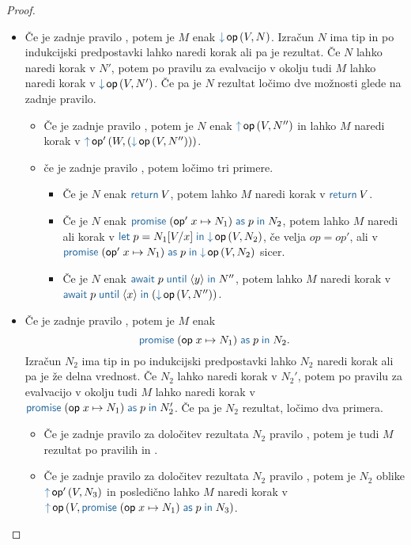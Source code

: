 \begin{proof}
\begin{itemize}
		\item Če je zadnje pravilo , potem je $M$ enak $\tmopin{op}{V}{N}$.
		Izračun $N$ ima tip in po indukcijski predpostavki lahko naredi korak ali pa je rezultat.
		Če $N$ lahko naredi korak v $N'$, potem po pravilu za evalvacijo v okolju tudi $M$ lahko naredi korak v $\tmopin{op}{V}{N'}$. 
		Če pa je $N$ rezultat ločimo dve možnosti glede na zadnje pravilo.
		\begin{itemize}
			\item Če je zadnje pravilo , potem je $N$ enak $\tmopout{op}{V}{N''}$ in lahko $M$ naredi korak v $\tmopout{op'}{W}{(\tmopin{op}{V}{N''})}$.
			\item če je zadnje pravilo , potem ločimo tri primere.
			\begin{itemize}
				\item Če je $N$ enak $\tmreturn{V}$, potem lahko $M$ naredi korak v $\tmreturn{V}$.
				\item Če je $N$ enak $\tmwith{op'}{x}{N_1}{p}{N_2}$, potem lahko $M$ naredi ali korak v $\tmlet{p}{N_1[V/x]}{\tmopin{op}{V}{N_2}}$, če velja $op = op'$, ali v $\tmwith{op'}{x}{N_1}{p}{\tmopin{op}{V}{N_2}}$ sicer.
				\item Če je $N$ enak $\tmawait{p}{y}{N''}$, potem lahko $M$ naredi korak v $\tmawait{p}{x}{(\tmopin{op}{V}{N''})}$.
			\end{itemize}
		\end{itemize}
		
		
		\item Če je zadnje pravilo , potem je $M$ enak $$\tmwith{op}{x}{N_1}{p}{N_2}.$$
		Izračun $N_2$ ima tip in po indukcijski predpostavki lahko $N_2$ naredi korak ali pa je že delna vrednost.
		Če $N_2$ lahko naredi korak v $N_2'$, potem po pravilu za evalvacijo v okolju tudi $M$ lahko naredi korak v $\tmwith{op}{x}{N_1}{p}{N_2'}$.
		Če pa je $N_2$ rezultat, ločimo dva primera.
		\begin{itemize}
			\item Če je zadnje pravilo za določitev rezultata $N_2$ pravilo , potem je tudi $M$ rezultat po pravilih  in .
			\item Če je zadnje pravilo za določitev rezultata $N_2$ pravilo , potem je $N_2$ oblike $\tmopout{op'}{V}{N_3}$ in posledično lahko $M$ naredi korak v $\tmopout{op}{V}{\tmwith{op}{x}{N_1}{p}{N_3}}$.
		\end{itemize}
		 

\end{itemize}
\end{proof}
